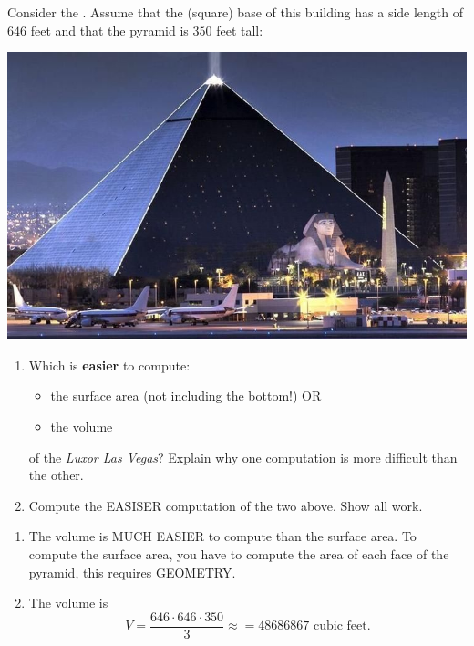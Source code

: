 \documentclass[handout,nooutcomes,noauthor,hints1,12pt]{ximera}
\begin{document}
 \begin{question}   Consider the .  Assume that the (square) base of this building has a side length of
 $646$ feet and that the pyramid is $350$ feet tall:
  \begin{center}
    \includegraphics[width=.4\textwidth]{pyramid.jpg} 
  \end{center}

  \begin{enumerate}
  \item Which is \textbf{easier} to compute:
    \begin{itemize}
    \item the surface area (not including the bottom!) OR
    \item the volume
    \end{itemize}
    of the \textit{Luxor Las Vegas}?
    Explain why one computation is more difficult than the other.
    \item Compute the EASISER computation of the two above. Show all
      work.
  \end{enumerate}

   \begin{freeResponse}
    \begin{enumerate}
      \item The volume is MUCH EASIER to compute than the surface
        area. To compute the surface area, you have to compute the
        area of each face of the pyramid, this requires GEOMETRY.

      \item The volume is
        \[
        V = \frac{646\cdot 646\cdot 350}{3} \approx = 48686867 \text{ cubic feet}.
        \]
    \end{enumerate}
  \end{freeResponse}
\end{question}

\mynewpage
\end{document}
